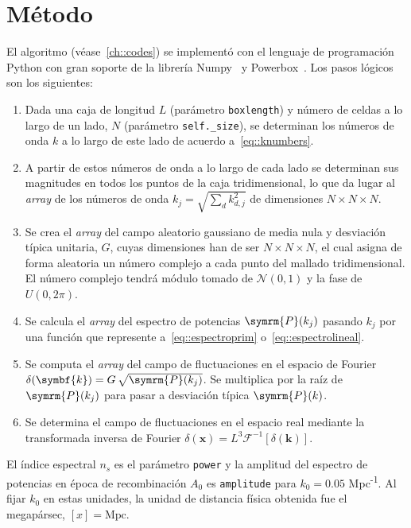\section{Método}\label{sec::metodo}
El algoritmo (véase~\autoref{ch::codes}) se implementó con el lenguaje de programación Python con gran soporte de la librería Numpy~\cite{harris2020array} y Powerbox~\cite{Murray2018}. Los pasos lógicos son los siguientes:
\begin{enumerate}
    \item Dada una caja de longitud \(L\) (parámetro \texttt{boxlength}) y número de celdas a lo largo de un lado, \(N\) (parámetro \texttt{self.\_size}), se determinan los números de onda \(k\) a lo largo de este lado de acuerdo a~\eqref{eq::knumbers}.
    \item A partir de estos números de onda a lo largo de cada lado se determinan sus magnitudes en todos los puntos de la caja tridimensional, lo que da lugar al \textit{array} de los números de onda \(k_j=\sqrt{\sum_d k^2_{d,j}}\) de dimensiones \(N\times N\times N\).
    \item Se crea el \textit{array} del campo aleatorio gaussiano de media nula y desviación típica unitaria, \(G\), cuyas dimensiones han de ser \(N\times N\times N\), el cual asigna de forma aleatoria un número complejo a cada punto del mallado tridimensional. El número complejo tendrá módulo tomado de \(\mathcal{N}(0,1)\) y la fase de \(U(0,2\pi)\).
    \item Se calcula el \textit{array} del espectro de potencias \(\symrm{P}(k_j)\) pasando \(k_j\) por una función que represente a~\eqref{eq::espectroprim} o~\eqref{eq::espectrolineal}.
    \item Se computa el \textit{array} del campo de fluctuaciones en el espacio de Fourier \(\delta(\symbf{k})=G\,\sqrt{\symrm{P}(k_j)}\). Se multiplica por la raíz de \(\symrm{P}(k_j)\) para pasar a desviación típica \(\symrm{P}(k)\).
    \item Se determina el campo de fluctuaciones en el espacio real mediante la transformada inversa de Fourier \(\delta(\symbf{x})=L^3\mathcal{F}^{-1}\left[\delta(\symbf{k})\right]\).
\end{enumerate}
El índice espectral \(n_s\) es el parámetro \texttt{power} y la amplitud del espectro de potencias en época de recombinación \(A_0\) es \texttt{amplitude} para \(k_0=0.05\) Mpc\textsuperscript{-1}. Al fijar \(k_0\) en estas unidades, la unidad de distancia física obtenida fue el megapársec, \([x]=\text{Mpc}\).

